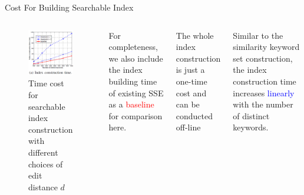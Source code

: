 \documentclass{beamer}
\begin{document}
\begin{frame}{Cost For Building Searchable Index}
    \begin{columns}
	\begin{figure}
		\includegraphics[width=\textwidth]{subfig2.jpg}
		\caption{Time cost for searchable index construction with different choices of edit distance $d$}
	\end{figure}
	    \begin{alertblock}{}
	    	For completeness, we also include the index building time of existing SSE as a \textcolor{red}{baseline} for comparison here.
	    \end{alertblock}
	    \begin{exampleblock}{}
	    	The whole index construction is just a one-time cost and can be conducted off-line
	    \end{exampleblock}
	\begin{block}{}
		Similar to the similarity keyword set construction, the index construction time increases \textcolor{blue}{linearly} with the number of distinct keywords.
	\end{block}
	\end{columns}
\end{frame}
\end{document}

